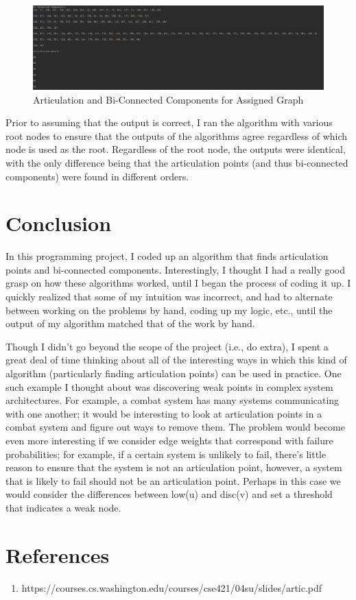 \documentclass[]{article}
\begin{document}
\begin{figure}[h]
	\centering
	\includegraphics[width=1\textwidth]{full}
		\caption{Articulation and Bi-Connected Components for Assigned Graph}\label{fig:full}
\end{figure}

Prior to assuming that the output is correct, I ran the algorithm with various root nodes to ensure that the outputs of the algorithms agree regardless of which node is used as the root. Regardless of the root node, the outputs were identical, with the only difference being that the articulation points (and thus bi-connected components) were found in different orders.

\section{Conclusion}
In this programming project, I coded up an algorithm that finds articulation points and bi-connected components. Interestingly, I thought I had a really good grasp on how these algorithms worked, until I began the process of coding it up. I quickly realized that some of my intuition was incorrect, and had to alternate between working on the problems by hand, coding up my logic, etc., until the output of my algorithm matched that of the work by hand.

Though I didn't go beyond the scope of the project (i.e., do extra), I spent a great deal of time thinking about all of the interesting ways in which this kind of algorithm (particularly finding articulation points) can be used in practice. One such example I thought about was discovering weak points in complex system architectures. For example, a combat system has many systems communicating with one another; it would be interesting to look at articulation points in a combat system and figure out ways to remove them. The problem would become even more interesting if we consider edge weights that correspond with failure probabilities; for example, if a certain system is unlikely to fail, there's little reason to ensure that the system is not an articulation point, however, a system that is likely to fail should not be an articulation point. Perhaps in this case we would consider the differences between low(u) and disc(v) and set a threshold that indicates a weak node. 

\section{References}
\begin{enumerate}
	\item https://courses.cs.washington.edu/courses/cse421/04su/slides/artic.pdf
\end{enumerate}
\end{document}
